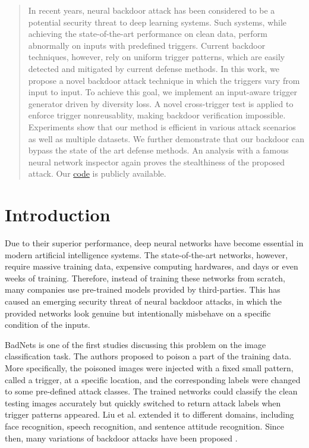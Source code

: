 \begin{abstract}
  In recent years, neural backdoor attack has been considered to be a potential security threat to deep learning systems. Such systems, while achieving the state-of-the-art performance on clean data, perform abnormally on inputs with predefined triggers. Current backdoor techniques, however, rely on uniform trigger patterns, which are easily detected and mitigated by current defense methods. In this work, we propose a novel backdoor attack technique in which the triggers vary from input to input. To achieve this goal, we implement an input-aware trigger generator driven by diversity loss. A novel cross-trigger test is applied to enforce trigger nonreusablity, making backdoor verification impossible. Experiments show that our method is efficient in various attack scenarios as well as multiple datasets. We further demonstrate that our backdoor can bypass the state of the art defense methods. An analysis with a famous neural network inspector again proves the stealthiness of the proposed attack. Our \href{https://github.com/VinAIResearch/input-aware-backdoor-attack-release}{code} is publicly available.
\end{abstract}

\section{Introduction}

Due to their superior performance, deep neural networks have become essential in modern artificial intelligence systems. The state-of-the-art networks, however, require massive training data, expensive computing hardwares, and days or even weeks of training. Therefore, instead of training these networks from scratch, many companies use pre-trained models provided by third-parties. This has caused an emerging security threat of neural backdoor attacks, in which the provided networks look genuine but intentionally misbehave on a specific condition of the inputs.

BadNets \cite{gu2017badnets} is one of the first studies discussing this problem on the image classification task. The authors proposed to poison a part of the training data. More specifically, the poisoned images were injected with a fixed small pattern, called a trigger, at a specific location, and the corresponding labels were changed to some pre-defined attack classes. The trained networks could classify the clean testing images accurately but quickly switched to return attack labels when trigger patterns appeared. Liu et al. \cite{liu2017trojaning} extended it to different domains, including face recognition, speech recognition, and sentence attitude recognition. Since then, many variations of backdoor attacks have been proposed \cite{chen2017targeted,yao2019latent}.

